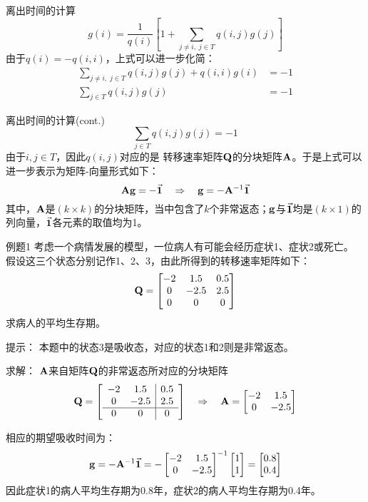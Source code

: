 \documentclass[t]{beamer}
\begin{document}
\begin{frame}{离出时间的计算}
  \[
    g(i)=\frac{1}{q(i)}\left[1+\sum_{j\ne i,\; j\in T}q(i,j)g(j)\right]
\]
由于$q(i)=-q(i,i)$，上式可以进一步化简：
\[\begin{split}
	\sum_{j\ne i,\; j\in T}q(i,j)g(j)+q(i,i)g(i)&=-1\\ 
	\sum_{j\in T}q(i,j)g(j)&=-1
\end{split}\]
\end{frame}

\begin{frame}{离出时间的计算(cont.)}
  \[\sum_{j\in T}q(i,j)g(j)=-1\]
  由于$i,j\in T$，因此$q(i,j)$对应的是
  转移速率矩阵${\bf Q}$的分块矩阵${\bf A}$。于是上式可以进一步表示为矩阵-向量形式如下：
  \begin{equation*}
    {\bf A}{\bf g}=-\vec{\bf 1}\quad \Rightarrow\quad {\bf g}=-{\bf A}^{-1}\vec{\bf 1}
  \end{equation*}
  其中，${\bf A}$是$(k\times k)$的分块矩阵，当中包含了$k$个非常返态；${\bf g}$与$\vec{\bf 1}$均是$(k\times 1)$的列向量，$\vec{\bf 1}$各元素的取值均为1。
\end{frame}

\begin{frame}{例题1}
  考虑一个病情发展的模型，一位病人有可能会经历症状1、症状2或死亡。
  假设这三个状态分别记作1、2、3，由此所得到的转移速率矩阵如下：
  \[{\bf Q}=\begin{bmatrix}
    -2&1.5&0.5\\ 0& -2.5&2.5\\ 0&0&0
  \end{bmatrix} \]
  求病人的平均生存期。

\begin{block}{提示：}
  本题中的状态3是吸收态，对应的状态1和2则是非常返态。
\end{block}
\end{frame}

\begin{frame}{求解：}
${\bf A}$来自矩阵${\bf Q}$的非常返态所对应的分块矩阵
\[{\bf Q}=\left[\begin{array}{cc|c}
    -2&1.5&0.5\\ 0& -2.5&2.5\\
    \hline 0&0&0
  \end{array}\right] \quad \Rightarrow\quad {\bf A}=\begin{bmatrix}
	-2&1.5\\0& -2.5
\end{bmatrix} \]

相应的期望吸收时间为：
\[{\bf g}=-{\bf A}^{-1}\vec{\bf 1}=-\begin{bmatrix}
	-2&1.5\\0& -2.5
\end{bmatrix}^{-1}\begin{bmatrix}
	1\\1
\end{bmatrix}=\begin{bmatrix}
0.8\\0.4
\end{bmatrix}\]
因此症状1的病人平均生存期为0.8年，症状2的病人平均生存期为0.4年。
\end{frame}
\end{document}
